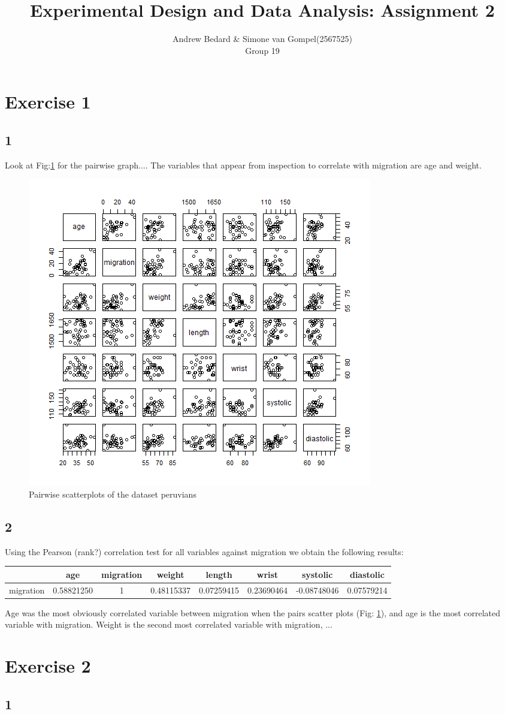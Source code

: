 \documentclass{article}
\title{Experimental Design and Data Analysis: Assignment 2}
\author{Andrew Bedard \& Simone van Gompel(2567525) \\ Group 19}
\begin{document}
  \maketitle

  \section{Exercise 1}
  \subsection*{1}
  	Look at Fig:\ref{fig:Pairs} for the pairwise graph....
  	The variables that appear from inspection to correlate with migration are age and weight.

    \begin{figure}
      \includegraphics[scale=0.6]{../results/Pairs.png}
      \caption{Pairwise scatterplots of the dataset peruvians}
      \label{fig:Pairs}
    \end{figure}
    
    \subsection*{2}
    Using the Pearson (rank?) correlation test for all variables against migration we obtain the following results:
    \newline
    \begin{tabular}{|c|c|c|c|c|c|c|c|}
    \hline 
     & age & migration & weight & length & wrist & systolic & diastolic \\ 
    \hline 
    migration & 0.58821250 & 1 & 0.48115337 & 0.07259415 & 0.23690464 & -0.08748046 & 0.07579214 \\ 
    \hline 
    \end{tabular} 
    
    Age was the most obviously correlated variable between migration when the pairs scatter plots (Fig: \ref{fig:Pairs}), and age is the most correlated variable with migration.
    Weight is the second most correlated variable with migration, ...
    
    \section{Exercise 2}
    \subsection*{1}
\end{document}
